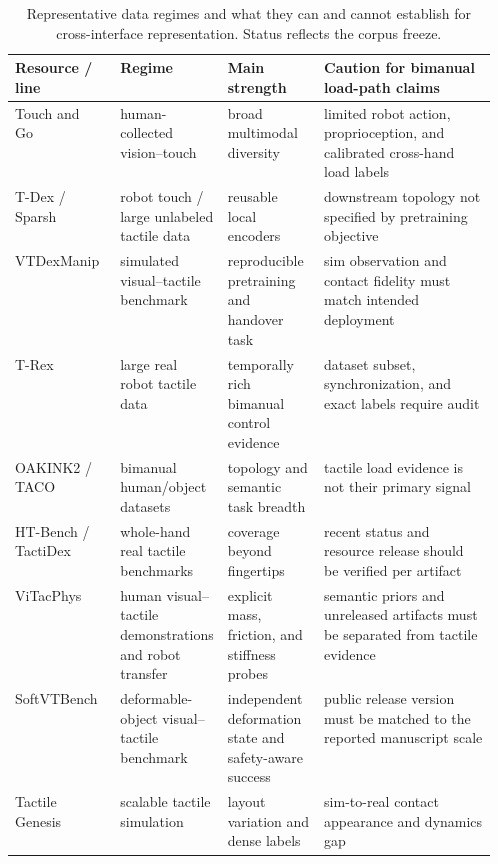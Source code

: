 \begin{table}[t]
\centering
\caption{Representative data regimes and what they can and cannot establish for
cross-interface representation. Status reflects the corpus freeze.}
\label{tab:data_regimes}
\begin{tabularx}{\linewidth}{P{0.18\linewidth} P{0.18\linewidth} P{0.20\linewidth} Y}
\toprule
\textbf{Resource / line} & \textbf{Regime} & \textbf{Main strength} & \textbf{Caution for bimanual load-path claims} \\
\midrule
Touch and Go~\cite{yang2022touchandgo} & human-collected vision--touch & broad multimodal diversity & limited robot action, proprioception, and calibrated cross-hand load labels \\
T-Dex / Sparsh~\cite{guzey2023tdex,higuera2025sparsh} & robot touch / large unlabeled tactile data & reusable local encoders & downstream topology not specified by pretraining objective \\
VTDexManip~\cite{liu2025vtdexmanip} & simulated visual--tactile benchmark & reproducible pretraining and handover task & sim observation and contact fidelity must match intended deployment \\
T-Rex~\cite{niu2026trex} & large real robot tactile data & temporally rich bimanual control evidence & dataset subset, synchronization, and exact labels require audit \\
OAKINK2 / TACO~\cite{zhan2024oakink2,liu2024taco} & bimanual human/object datasets & topology and semantic task breadth & tactile load evidence is not their primary signal \\
HT-Bench / TactiDex~\cite{huang2026htbench,ni2026tactidex} & whole-hand real tactile benchmarks & coverage beyond fingertips & recent status and resource release should be verified per artifact \\
ViTacPhys~\cite{liu2026vitacphys} & human visual--tactile demonstrations and robot transfer & explicit mass, friction, and stiffness probes & semantic priors and unreleased artifacts must be separated from tactile evidence \\
SoftVTBench~\cite{jing2026softvtbench} & deformable-object visual--tactile benchmark & independent deformation state and safety-aware success & public release version must be matched to the reported manuscript scale \\
Tactile Genesis~\cite{chung2026tactilegenesis} & scalable tactile simulation & layout variation and dense labels & sim-to-real contact appearance and dynamics gap \\
\bottomrule
\end{tabularx}
\end{table}

